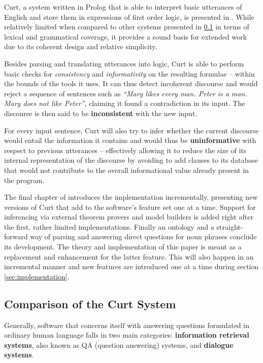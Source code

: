 \documentclass[a4paper]{article}
\newcommand{\abbr}{\textsf} %
\newcommand{\term}[1]{\textsf{\textbf{#1}}} %
\newcommand{\pn}{\textsf} %
\newcommand{\curt}{\pn{Curt}}
\newcommand{\prol}{\pn{Prolog}}
\theoremstyle{remark}
\theoremstyle{remark}
\theoremstyle{definition}
\theoremstyle{definition}
\begin{document}
\curt, a system written in \prol{} that is able to interpret basic utterances
of English and store them in expressions of first order logic, is
presented in \cite[chapter 6]{blackburnbos:cl1}. While relatively limited when
compared to other systems presented in \ref{sec:comparison} in terms of lexical
and grammatical coverage, it provides a sound basis for extended work due to
its coherent design and relative simplicity.

Besides parsing and translating utterances into logic, \curt{} is able to perform
basic checks for \emph{consistency} and \emph{informativity} on the resulting
formulae -- within the bounds of the tools it uses.
It can thus detect incoherent discourse and would reject a sequence of
sentences such as \emph{``Mary likes every man. Peter is a man. Mary does not
like Peter''}, claiming it found a contradiction in its input. The discourse is
then said to be \term{inconsistent} with the new input.

For every input
sentence, \curt{} will also try to infer whether the current discourse would
entail the information it contains and would thus be \term{uninformative} with
respect to previous utterances – effectively allowing it to
reduce the size of its internal representation of the discourse by avoiding to
add clauses to its database that would not contribute to the overall informational value
already present in the program.

The final chapter of \cite{blackburnbos:cl1} introduces the implementation
incrementally, presenting new versions of \curt{} that add to the software's
feature set one at a time. Support for inferencing via external theorem provers
and model builders is added right after the first, rather limited implementations.
Finally an ontology and a straight-forward way of parsing and answering direct
questions for noun phrases conclude its development. The theory and
implementation of this paper is meant as a replacement and enhancement for the
latter feature. This will also happen in an incremental manner and new features
are introduced one at a time during section \ref{sec:implementation}.

\subsection{Comparison of the Curt System}\label{sec:comparison}

Generally, software that concerns itself with answering questions formulated in
ordinary human language falls in two main categories: \term{information
retrieval systems}, also known as \abbr{QA} (question answering) systems, and
\term{dialogue systems}.
\end{document}
